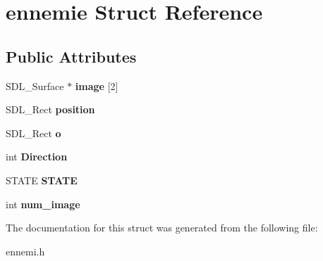 \hypertarget{structennemie}{}\section{ennemie Struct Reference}
\label{structennemie}
\subsection*{Public Attributes}
\begin{DoxyCompactItemize}
\item 
\mbox{\label{structennemie_a2281554862c5716469de4e06699b726f}} 
S\+D\+L\+\_\+\+Surface $\ast$ {\bfseries image} \mbox{[}2\mbox{]}
\item 
\mbox{\label{structennemie_a3f6081d509ec35ca30bf1e0f2ebb8222}} 
S\+D\+L\+\_\+\+Rect {\bfseries position}
\item 
\mbox{\label{structennemie_a35865f7f9f7bc51ab0485f24bbf163d2}} 
S\+D\+L\+\_\+\+Rect {\bfseries o}
\item 
\mbox{\label{structennemie_ab54138105ee43acc7526f6cdf5139738}} 
int {\bfseries Direction}
\item 
\mbox{\label{structennemie_a5818fc12fac3135c9b4d94186b2bef73}} 
S\+T\+A\+TE {\bfseries S\+T\+A\+TE}
\item 
\mbox{\label{structennemie_a5145ad233acb006ad9f3a4ae48797611}} 
int {\bfseries num\+\_\+image}
\end{DoxyCompactItemize}


The documentation for this struct was generated from the following file\+:\begin{DoxyCompactItemize}
\item 
ennemi.\+h\end{DoxyCompactItemize}
